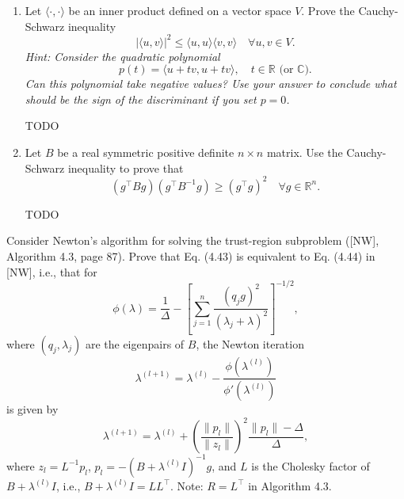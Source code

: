 \documentclass{../kin_math}
\begin{document}
\begin{questions}
  \question
  \begin{enumerate}
    \item Let $\langle \cdot, \cdot \rangle$ be an inner product defined on a vector space $V$. Prove the Cauchy-Schwarz inequality
    \begin{equation}
      |\langle u, v \rangle|^2 \leq \langle u, u \rangle \langle v, v \rangle \quad \forall u, v \in V.
    \end{equation}
    \emph{Hint: Consider the quadratic polynomial}
    \begin{equation}
      p(t) = \langle u + tv, u + tv \rangle, \quad t \in \mathbb{R} \text{ (or $\mathbb{C}$)}.
    \end{equation}
    \emph{Can this polynomial take negative values? Use your answer to conclude what should be the sign of the discriminant if you set $p = 0$.}
    \begin{solution}
      TODO
    \end{solution}
    \item Let $B$ be a real symmetric positive definite $n \times n$ matrix. Use the Cauchy-Schwarz inequality to prove that
    \begin{equation}
      (g^\top B g)(g^\top B^{-1} g) \geq (g^\top g)^2 \quad \forall g \in \mathbb{R}^n.
    \end{equation}
    \begin{solution}
      TODO
    \end{solution}
  \end{enumerate}

  \question Consider Newton’s algorithm for solving the trust-region subproblem ([NW], Algorithm 4.3, page 87). Prove that Eq. (4.43) is equivalent to Eq. (4.44) in [NW], i.e., that for
  \begin{equation*}
    \phi(\lambda) = \frac{1}{\Delta} - \left[\sum_{j = 1}^n \frac{(q_j g)^2}{(\lambda_j + \lambda)^2}\right]^{-1 / 2},
  \end{equation*}
  where $(q_j, \lambda_j)$ are the eigenpairs of $B$, the Newton iteration
  \begin{equation*}
    \lambda^{(l + 1)} = \lambda^{(l)} - \frac{\phi(\lambda^{(l)})}{\phi'(\lambda^{(l)})}
  \end{equation*}
  is given by
  \begin{equation*}
    \lambda^{(l + 1)} = \lambda^{(l)} + \left(\frac{\lVert p_l \rVert}{\lVert z_l \rVert}\right)^2 \frac{\lVert p_l \rVert - \Delta}{\Delta},
  \end{equation*}
  where $z_l = L^{-1} p_l$, $p_l = -(B + \lambda^{(l)} I)^{-1} g$, and $L$ is the Cholesky factor of $B + \lambda^{(l)} I$, i.e., $B + \lambda^{(l)} I = LL^\top$. Note: $R = L^\top$ in Algorithm 4.3.


\end{questions}
\end{document}
